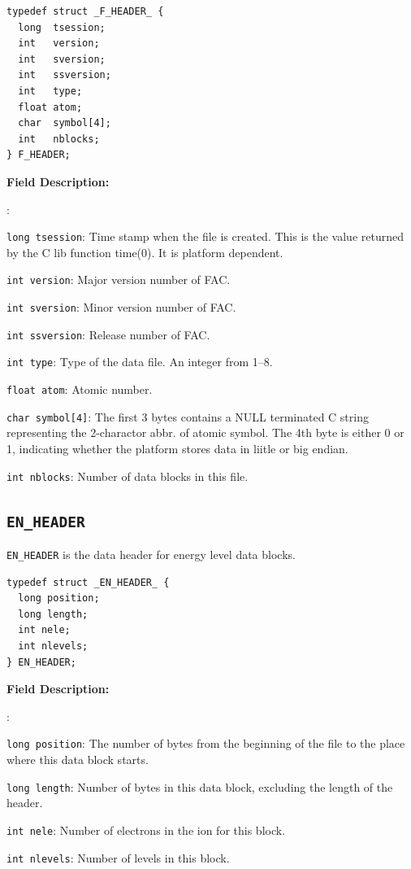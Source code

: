 \documentclass[twoside,letterpaper]{refrep}
\newenvironment{dbdesc}{\textbf{Field Description:} \begin{list}
	{:}{\setlength{\labelwidth}{2in}
	   \setlength{\leftmargin}{2in}
	   \setlength{\labelsep}{0.1in}
	   \setlength{\rightmargin}{0.2in}}}
	{\end{list}}
\begin{document}
\begin{verbatim}
typedef struct _F_HEADER_ {
  long  tsession;
  int   version;
  int   sversion;
  int   ssversion;
  int   type;
  float atom;
  char  symbol[4];
  int   nblocks;
} F_HEADER;
\end{verbatim}

\begin{dbdesc}
\item[\texttt{long tsession}:] Time stamp when the file is created. This is the
value returned by the C lib function time(0). It is platform dependent. 
\item[\texttt{int version}:] Major version number of FAC.
\item[\texttt{int sversion}:] Minor version number of FAC.
\item[\texttt{int ssversion}:] Release number of FAC.
\item[\texttt{int type}:] Type of the data file. An integer from 1--8.
\item[\texttt{float atom}:] Atomic number.
\item[\texttt{char symbol[4]}:] The first 3 bytes contains a NULL
terminated C string representing the 2-charactor abbr. of atomic symbol. The
4th byte is either 0 or 1, indicating whether the platform stores data in
liitle or big endian.
\item[\texttt{int nblocks}:] Number of data blocks in this file.
\end{dbdesc}

\subsection{\texttt{EN\_HEADER}}
\texttt{EN\_HEADER} is the data header for energy level data blocks.

\begin{verbatim}
typedef struct _EN_HEADER_ {
  long position;
  long length;
  int nele;
  int nlevels;
} EN_HEADER;
\end{verbatim}

\begin{dbdesc}
\item[\texttt{long position}:] The number of bytes from the beginning of the
file to the place where this data block starts.
\item[\texttt{long length}:] Number of bytes in this data block, excluding the
length of the header.
\item[\texttt{int nele}:] Number of electrons in the ion for this block.
\item[\texttt{int nlevels}:] Number of levels in this block.
\end{dbdesc}
\end{document}
